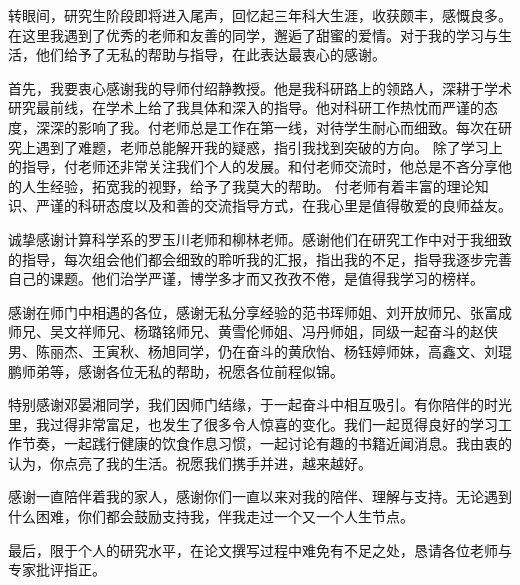 

\begin{ack}
	转眼间，研究生阶段即将进入尾声，回忆起三年科大生涯，收获颇丰，感慨良多。在这里我遇到了优秀的老师和友善的同学，邂逅了甜蜜的爱情。对于我的学习与生活，他们给予了无私的帮助与指导，在此表达最衷心的感谢。

	首先，我要衷心感谢我的导师付绍静教授。他是我科研路上的领路人，深耕于学术研究最前线，在学术上给了我具体和深入的指导。他对科研工作热忱而严谨的态度，深深的影响了我。付老师总是工作在第一线，对待学生耐心而细致。每次在研究上遇到了难题，老师总能解开我的疑惑，指引我找到突破的方向。
	除了学习上的指导，付老师还非常关注我们个人的发展。和付老师交流时，他总是不吝分享他的人生经验，拓宽我的视野，给予了我莫大的帮助。
	付老师有着丰富的理论知识、严谨的科研态度以及和善的交流指导方式，在我心里是值得敬爱的良师益友。
	
	诚挚感谢计算科学系的罗玉川老师和柳林老师。感谢他们在研究工作中对于我细致的指导，每次组会他们都会细致的聆听我的汇报，指出我的不足，指导我逐步完善自己的课题。他们治学严谨，博学多才而又孜孜不倦，是值得我学习的榜样。

	感谢在师门中相遇的各位，感谢无私分享经验的范书珲师姐、刘开放师兄、张富成师兄、吴文祥师兄、杨璐铭师兄、黄雪伦师姐、冯丹师姐，同级一起奋斗的赵侠男、陈丽杰、王寅秋、杨旭同学，仍在奋斗的黄欣怡、杨钰婷师妹，高鑫文、刘琨鹏师弟等，感谢各位无私的帮助，祝愿各位前程似锦。

	特别感谢邓晏湘同学，我们因师门结缘，于一起奋斗中相互吸引。有你陪伴的时光里，我过得非常富足，也发生了很多令人惊喜的变化。我们一起觅得良好的学习工作节奏，一起践行健康的饮食作息习惯，一起讨论有趣的书籍近闻消息。我由衷的认为，你点亮了我的生活。祝愿我们携手并进，越来越好。
	
	感谢一直陪伴着我的家人，感谢你们一直以来对我的陪伴、理解与支持。无论遇到什么困难，你们都会鼓励支持我，伴我走过一个又一个人生节点。
	
	最后，限于个人的研究水平，在论文撰写过程中难免有不足之处，恳请各位老师与专家批评指正。

\end{ack}
